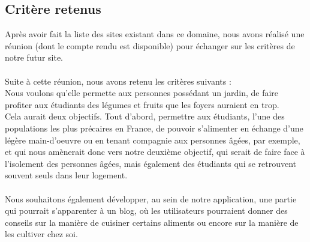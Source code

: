 \documentclass{tnreport}
\begin{document}
\subsection*{Critère retenus}
\begin{sloppypar}
Après avoir fait la liste des sites existant dans ce domaine, nous avons réalisé une réunion (dont le compte rendu est disponible) pour échanger sur les critères de notre futur site.\\
\\
Suite à cette réunion, nous avons retenu les critères suivants : 
\\
Nous voulons qu'elle permette aux personnes possédant un jardin, de  faire profiter aux étudiants des légumes et fruits que les foyers auraient en trop.
\\
Cela aurait deux objectifs. Tout d'abord, permettre aux étudiants, l'une des populations les plus précaires en France, de pouvoir s'alimenter en échange d'une légère main-d'oeuvre ou en tenant compagnie aux personnes âgées, par exemple, et qui nous amènerait donc vers notre deuxième objectif, qui serait de faire face à l'isolement des personnes âgées, mais également des étudiants qui se retrouvent souvent seuls dans leur logement.\\
\\
Nous souhaitons également développer, au sein de notre application, une partie qui pourrait s'apparenter à un blog, où les utilisateurs pourraient donner des conseils sur la manière de cuisiner certains aliments ou encore sur la manière de les cultiver chez soi.
\end{sloppypar}
\end{document}
